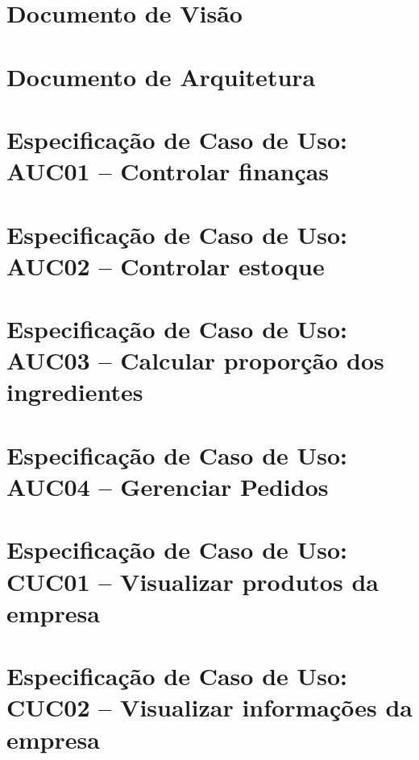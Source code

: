 \begin{anexosenv}
\partanexos
\chapter{Documento de Visão} \label{doc:visao}


\chapter{Documento de Arquitetura} \label{doc:arq}


\chapter{Especificação de Caso de Uso: AUC01 -- Controlar finanças} \label{doc:auc01}


\chapter{Especificação de Caso de Uso: AUC02 -- Controlar estoque} \label{doc:auc02}


\chapter{Especificação de Caso de Uso: AUC03 -- Calcular proporção dos ingredientes} \label{doc:auc03}


\chapter{Especificação de Caso de Uso: AUC04 -- Gerenciar Pedidos} \label{doc:auc04}


\chapter{Especificação de Caso de Uso: CUC01 -- Visualizar produtos da empresa} \label{doc:cuc01}


\chapter{Especificação de Caso de Uso: CUC02 -- Visualizar informações da empresa} \label{doc:cuc02}


\end{anexosenv}
